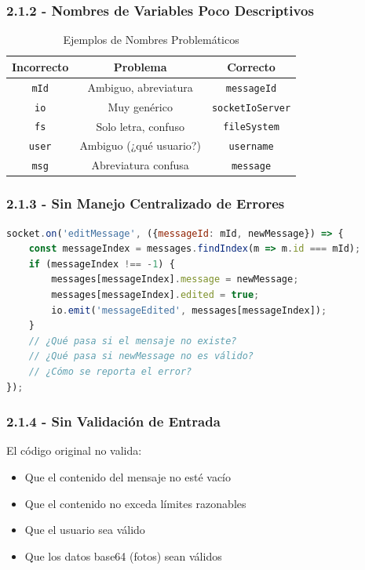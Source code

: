 \documentclass[12pt,a4paper]{article}
\begin{document}
\subsubsection{2.1.2 - Nombres de Variables Poco Descriptivos}

\begin{table}[h]
\centering
\caption{Ejemplos de Nombres Problemáticos}
\begin{tabular}{|c|c|c|}
\hline
\textbf{Incorrecto} & \textbf{Problema} & \textbf{Correcto} \\
\hline
\texttt{mId} & Ambiguo, abreviatura & \texttt{messageId} \\
\texttt{io} & Muy genérico & \texttt{socketIoServer} \\
\texttt{fs} & Solo letra, confuso & \texttt{fileSystem} \\
\texttt{user} & Ambiguo (¿qué usuario?) & \texttt{username} \\
\texttt{msg} & Abreviatura confusa & \texttt{message} \\
\hline
\end{tabular}
\end{table}

\subsubsection{2.1.3 - Sin Manejo Centralizado de Errores}

\begin{lstlisting}[caption=Código Original - Sin Manejo de Errores, language=JavaScript]
socket.on('editMessage', ({messageId: mId, newMessage}) => {
    const messageIndex = messages.findIndex(m => m.id === mId);
    if (messageIndex !== -1) {
        messages[messageIndex].message = newMessage;
        messages[messageIndex].edited = true;
        io.emit('messageEdited', messages[messageIndex]);
    }
    // ¿Qué pasa si el mensaje no existe?
    // ¿Qué pasa si newMessage no es válido?
    // ¿Cómo se reporta el error?
});
\end{lstlisting}

\subsubsection{2.1.4 - Sin Validación de Entrada}

El código original no valida:
\begin{itemize}
    \item Que el contenido del mensaje no esté vacío
    \item Que el contenido no exceda límites razonables
    \item Que el usuario sea válido
    \item Que los datos base64 (fotos) sean válidos
\end{itemize}
\end{document}
